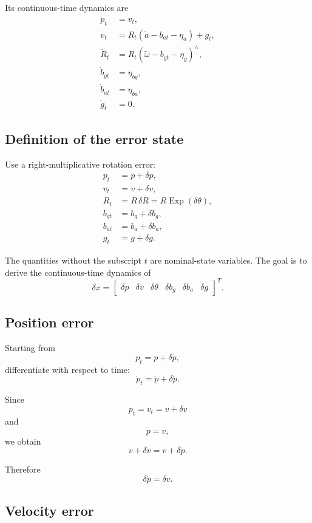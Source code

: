 \documentclass[11pt]{article}
\numberwithin{equation}{section}
\newcommand{\Exp}{\operatorname{Exp}}
\begin{document}
Its continuous-time dynamics are
\begin{align}
\dot p_t &= v_t,\\
\dot v_t &= R_t(\tilde a-b_{at}-\eta_a)+g_t,\\
\dot R_t &= R_t(\tilde\omega-b_{gt}-\eta_g)^\wedge,\\
\dot b_{gt} &= \eta_{bg},\\
\dot b_{at} &= \eta_{ba},\\
\dot g_t &= 0.
\end{align}

\subsection{Definition of the error state}

Use a right-multiplicative rotation error:
\begin{align}
p_t &= p+\delta p,\\
v_t &= v+\delta v,\\
R_t &= R\,\delta R
    =R\Exp(\delta\theta),\\
b_{gt} &= b_g+\delta b_g,\\
b_{at} &= b_a+\delta b_a,\\
g_t &= g+\delta g.
\end{align}

The quantities without the subscript $t$ are nominal-state variables.
The goal is to derive the continuous-time dynamics of
\[
\delta x=
\begin{bmatrix}
\delta p &
\delta v &
\delta\theta &
\delta b_g &
\delta b_a &
\delta g
\end{bmatrix}^{T}.
\]

\subsection{Position error}

Starting from
\[
p_t=p+\delta p,
\]
differentiate with respect to time:
\[
\dot p_t=\dot p+\delta\dot p.
\]

Since
\[
\dot p_t=v_t=v+\delta v
\]
and
\[
\dot p=v,
\]
we obtain
\[
v+\delta v=v+\delta\dot p.
\]

Therefore
\begin{equation}
\boxed{
\delta\dot p=\delta v.
}
\end{equation}

\subsection{Velocity error}
\end{document}
